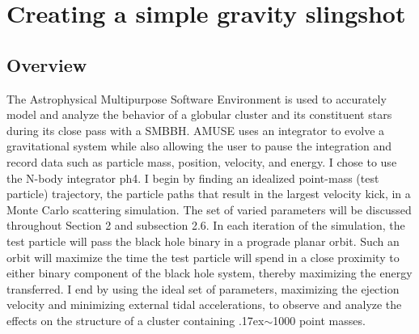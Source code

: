 \documentclass{aastex62}
\begin{document}
\section{Creating a simple gravity slingshot}
\subsection{Overview}
The Astrophysical Multipurpose Software Environment \citep{zwart18} is used to accurately model and analyze the behavior of a globular cluster and its constituent stars during its close pass with a SMBBH. AMUSE uses an integrator to evolve a gravitational system while also allowing the user to pause the integration and record data such as particle mass, position, velocity, and energy. I chose to use the N-body integrator ph4. I begin by finding an idealized point-mass (test particle) trajectory, the particle paths that result in the largest velocity kick, in a Monte Carlo scattering simulation. The set of varied parameters will be discussed throughout Section 2 and subsection 2.6. In each iteration of the simulation, the test particle will pass the black hole binary in a prograde planar orbit. Such an orbit will maximize the time the test particle will spend in a close proximity to either binary component of the black hole system, thereby maximizing the energy transferred. I end by using the ideal set of parameters, maximizing the ejection velocity and minimizing external tidal accelerations, to observe and analyze the effects on the structure of a cluster containing {\raise.17ex\hbox{$\scriptstyle\mathtt{\sim}$}}1000 point masses. 
\end{document}
